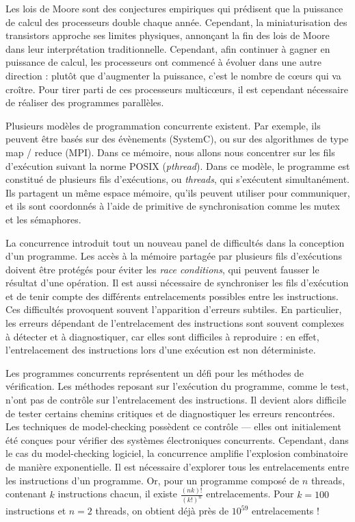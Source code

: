 Les lois de Moore sont des conjectures empiriques qui prédisent que la
puissance de calcul des processeurs double chaque année. Cependant, la
miniaturisation des transistors approche ses limites physiques,
annonçant la fin des lois de Moore dans leur interprétation
traditionnelle. Cependant, afin continuer à gagner en puissance de
calcul, les processeurs ont commencé à évoluer dans une autre direction
: plutôt que d'augmenter la puissance, c'est le nombre de cœurs qui va
croître. Pour tirer parti de ces processeurs multicœurs, il est
cependant nécessaire de réaliser des programmes parallèles.

Plusieurs modèles de programmation concurrente existent. Par exemple, ils
peuvent être basés sur des évènements (SystemC), ou sur des algorithmes
de type map / reduce (MPI). Dans ce mémoire, nous allons nous concentrer
sur les fils d'exécution suivant la norme POSIX (\emph{pthread}).
Dans ce modèle, le programme est constitué de plusieurs fils d'exécutions, ou
\emph{threads}, qui s'exécutent simultanément. Ils partagent un même espace
mémoire, qu'ils peuvent utiliser pour communiquer, et ils sont coordonnés à
l'aide de primitive de synchronisation comme les mutex et les sémaphores.

La concurrence introduit tout un nouveau panel de difficultés dans la conception
d'un programme. Les accès à la mémoire partagée par plusieurs fils d'exécutions
doivent être protégés pour éviter les \emph{ race conditions}, qui peuvent
fausser le résultat d'une opération. Il est aussi nécessaire de synchroniser les
fils d'exécution et de tenir compte des différents entrelacements possibles
entre les instructions. Ces difficultés provoquent souvent l'apparition
d'erreurs subtiles. En particulier, les erreurs dépendant de l'entrelacement des
instructions sont souvent complexes à détecter et à diagnostiquer, car elles sont
difficiles à reproduire : en effet, l'entrelacement des instructions lors d'une
exécution est non déterministe.

Les programmes concurrents représentent un défi pour les méthodes de
vérification. Les méthodes reposant sur l'exécution du programme, comme
le test, n'ont pas de contrôle sur l'entrelacement des instructions. Il
devient alors difficile de tester certains chemins critiques et de
diagnostiquer les erreurs rencontrées. Les techniques de model-checking
possèdent ce contrôle --- elles ont initialement été conçues pour vérifier
des systèmes électroniques concurrents. Cependant, dans le cas du
model-checking logiciel, la concurrence amplifie l'explosion
combinatoire de manière exponentielle. Il est nécessaire d'explorer tous
les entrelacements entre les instructions d'un programme. Or, pour un
programme composé de \(n\) threads, contenant \(k\) instructions chacun,
il existe \(\frac{(nk)!}{(k!)^n}\) entrelacements. Pour \(k = 100\)
instructions et \(n = 2\) threads, on obtient déjà près de \(10^{59}\)
entrelacements !

